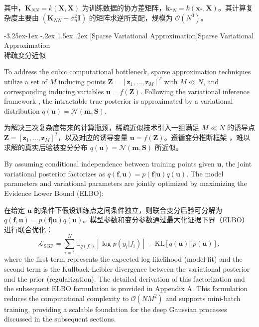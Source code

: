 \documentclass[11pt]{article}
\makeatletter
\renewcommand\subsection{\@startsection{subsection}{2}{\z@}%
                                         {-3.25ex\@plus -1ex \@minus -.2ex}%
                                         {1.5ex \@plus .2ex}%
                                         {\normalfont\fontfamily{phv}\fontsize{14}{17}\bfseries}}
\newcommand{\bisubsection}[2]{\subsection[#1]{#1\protect\\#2}}
\makeatother
\begin{document}
其中，$\mathbf{K}_{NN} = k(\mathbf{X}, \mathbf{X})$ 为训练数据的协方差矩阵，$\mathbf{k}_{*N} = k(\mathbf{x}_*, \mathbf{X})$。其计算复杂度主要由 $(\mathbf{K}_{NN} + \sigma_n^2 \mathbf{I})$ 的矩阵求逆所支配，规模为 $\mathcal{O}(N^3)$。



\bisubsection{Sparse Variational Approximation}{稀疏变分近似} \label{s:sec2.2}

To address the cubic computational bottleneck, sparse approximation techniques utilize a set of $M$ inducing points $\mathbf{Z} = [\mathbf{z}_1, \ldots, \mathbf{z}_M]^T$ with $M \ll N$, and corresponding inducing variables $\mathbf{u} = f(\mathbf{Z})$. Following the variational inference framework \citep{Titsias2009}, the intractable true posterior is approximated by a variational distribution $q(\mathbf{u}) = \mathcal{N}(\mathbf{m}, \mathbf{S})$. 

为解决三次复杂度带来的计算瓶颈，稀疏近似技术引入一组满足 $M \ll N$ 的诱导点 $\mathbf{Z} = [\mathbf{z}_1, \ldots, \mathbf{z}_M]^T$，以及对应的诱导变量 $\mathbf{u} = f(\mathbf{Z})$。遵循变分推断框架 \citep{Titsias2009}，难以求解的真实后验被变分分布 $q(\mathbf{u}) = \mathcal{N}(\mathbf{m}, \mathbf{S})$ 所近似。

By assuming conditional independence between training points given $\mathbf{u}$, the joint variational posterior factorizes as $q(\mathbf{f}, \mathbf{u}) = p(\mathbf{f}|\mathbf{u})q(\mathbf{u})$. The model parameters and variational parameters are jointly optimized by maximizing the Evidence Lower Bound (ELBO):

在给定 $\mathbf{u}$ 的条件下假设训练点之间条件独立，则联合变分后验可分解为 $q(\mathbf{f}, \mathbf{u}) = p(\mathbf{f}|\mathbf{u})q(\mathbf{u})$。模型参数和变分参数通过最大化证据下界（ELBO）进行联合优化：
\begin{equation}
	\mathcal{L}_{\text{SGP}} = \sum_{i=1}^{N} \mathbb{E}_{q(f_i)} [\log p(y_i | f_i)] - \text{KL}[q(\mathbf{u}) || p(\mathbf{u})],
\end{equation}
where the first term represents the expected log-likelihood (model fit) and the second term is the Kullback-Leibler divergence between the variational posterior and the prior (regularization). The detailed derivation of this factorization and the subsequent ELBO formulation is provided in Appendix A. This formulation reduces the computational complexity to $\mathcal{O}(NM^2)$ and supports mini-batch training, providing a scalable foundation for the deep Gaussian processes discussed in the subsequent sections.
\end{document}
